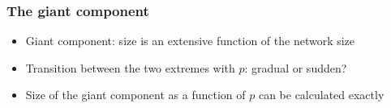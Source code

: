 \documentclass{beamer}
\begin{document}
\begin{frame}
    \frametitle{The giant component}
    \centering
    \begin{itemize}
        \setlength\itemsep{1em}
        \item{Giant component: size is an extensive function of the network size}
        \item{Transition between the two extremes with $p$: gradual or sudden?}
        \item{Size of the giant component as a function of $p$ can be calculated exactly}
    \end{itemize}
\end{frame}
\begin{frame}
    \frametitle{}
    \centering
\end{frame}
\begin{frame}
    \frametitle{}
    \centering
\end{frame}
\end{document}
